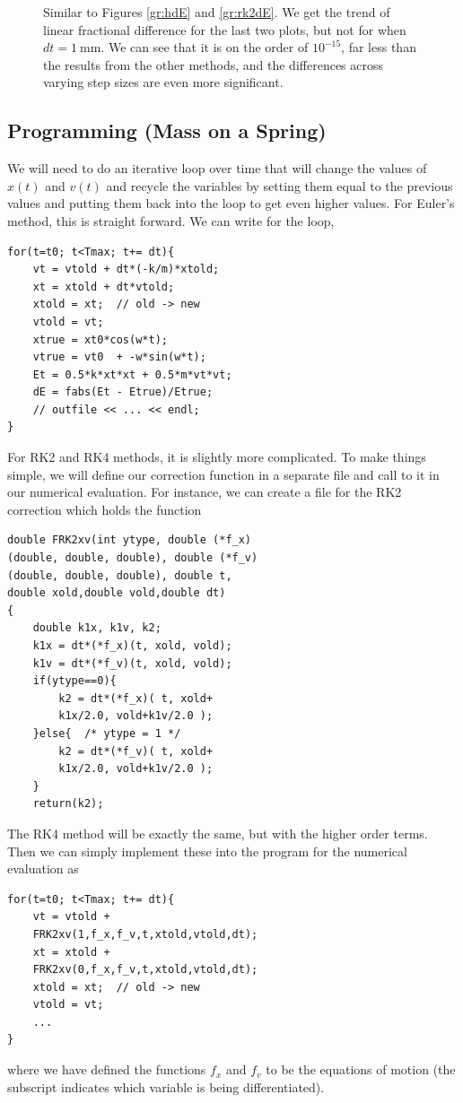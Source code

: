 \documentclass[aps,prl,twocolumn,superscriptaddress]{revtex4-1}
\begin{document}
\begin{figure}[htbp]
\begin{center}
  		\caption{Similar to Figures \ref{gr:hdE} and \ref{gr:rk2dE}. We get the trend of linear fractional difference for the last two plots, but not for when $dt = \SI{1}{\mm}$. We can see that it is on the order of $10^{-15}$, far less than the results from the other methods, and the differences across varying step sizes are even more significant.}
  		\label{gr:rk4dE}
 	\end{center}
\end{figure}

\subsection{Programming (Mass on a Spring)}
We will need to do an iterative loop over time that will change the values of $x(t)$ and $v(t)$ and recycle the variables by setting them equal to the previous values and putting them back into the loop to get even higher values. For Euler's method, this is straight forward. We can write for the loop,
\begin{lstlisting}
for(t=t0; t<Tmax; t+= dt){
	vt = vtold + dt*(-k/m)*xtold;
	xt = xtold + dt*vtold;
	xtold = xt;  // old -> new
	vtold = vt;
	xtrue = xt0*cos(w*t);
	vtrue = vt0  + -w*sin(w*t);
	Et = 0.5*k*xt*xt + 0.5*m*vt*vt;
	dE = fabs(Et - Etrue)/Etrue;
	// outfile << ... << endl;
}
\end{lstlisting}
For RK2 and RK4 methods, it is slightly more complicated. To make things simple, we will define our correction function in a separate file and call to it in our numerical evaluation. For instance, we can create a file for the RK2 correction which holds the function \cite{RK}
\begin{lstlisting}
double FRK2xv(int ytype, double (*f_x)
(double, double, double), double (*f_v)
(double, double, double), double t,
double xold,double vold,double dt)
{
	double k1x, k1v, k2;
	k1x = dt*(*f_x)(t, xold, vold);
	k1v = dt*(*f_v)(t, xold, vold);
	if(ytype==0){
		k2 = dt*(*f_x)( t, xold+
		k1x/2.0, vold+k1v/2.0 );
	}else{  /* ytype = 1 */
		k2 = dt*(*f_v)( t, xold+
		k1x/2.0, vold+k1v/2.0 );
	}
	return(k2);
\end{lstlisting}
The RK4 method will be exactly the same, but with the higher order terms. Then we can simply implement these into the program for the numerical evaluation as
\begin{lstlisting}
for(t=t0; t<Tmax; t+= dt){
	vt = vtold +
	FRK2xv(1,f_x,f_v,t,xtold,vtold,dt);
	xt = xtold +
	FRK2xv(0,f_x,f_v,t,xtold,vtold,dt);
	xtold = xt;  // old -> new
	vtold = vt;
	...
}
\end{lstlisting}
where we have defined the functions $f_x$ and $f_v$ to be the equations of motion (the subscript indicates which variable is being differentiated).
\end{document}
